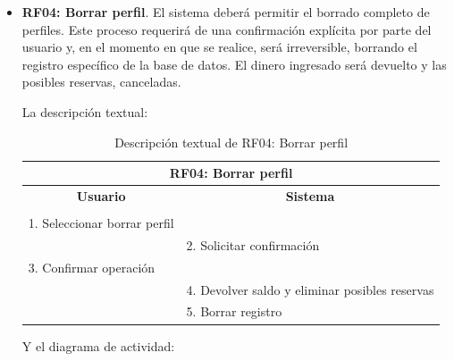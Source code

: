 \begin{itemize}
	\FloatBarrier
	\item \textbf{RF04: Borrar perfil}. El sistema deberá permitir el borrado completo de perfiles. Este proceso requerirá de una confirmación explícita por parte del usuario y, en el momento en que se realice, será irreversible, borrando el registro específico de la base de datos. El dinero ingresado será devuelto y las posibles reservas, canceladas.
	
	La descripción textual:
	
	\begin{table}[h]
		\centering	
		\begin{tabular}{|l|l|}
			\hline
			\multicolumn{2}{|c|}{\textbf{RF04: Borrar perfil}} \\ \hline
			\multicolumn{1}{|c|}{\textbf{Usuario}} & \multicolumn{1}{c|}{\textbf{Sistema}} \\ \hline
			[Pto. inclusión: RF02: Loguear usuario] &\\ \hline
			1. Seleccionar borrar perfil &\\ \hline
			& 2. Solicitar confirmación\\ \hline
			3. Confirmar operación &\\ \hline
			& 4. Devolver saldo y eliminar posibles reservas \\ \hline
			& 5. Borrar registro \\ \hline
		\end{tabular}
		\caption{Descripción textual de RF04: Borrar perfil}
		\label{tab:tablaDescTextualRF04}
	\end{table}
	
	Y el diagrama de actividad:
	

\end{itemize}
